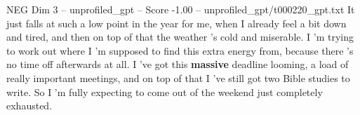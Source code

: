 \begin{textsample}{NEG Dim 3 – unprofiled\_gpt – Score -1.00 – unprofiled\_gpt/t000220\_gpt.txt}  \label{ex:f3_neg_004}
It just falls at such a low point in the year for me, when I already feel a bit down and tired, and then on top of that the weather ’s cold and miserable.
I ’m trying to work out where I ’m supposed to find this extra energy from, because there ’s no time off afterwards at all.
I ’ve got this \textbf{massive} deadline looming, a load of really important meetings, and on top of that I ’ve still got two Bible studies to write.
So I ’m fully expecting to come out of the weekend just completely exhausted.

\end{textsample}
